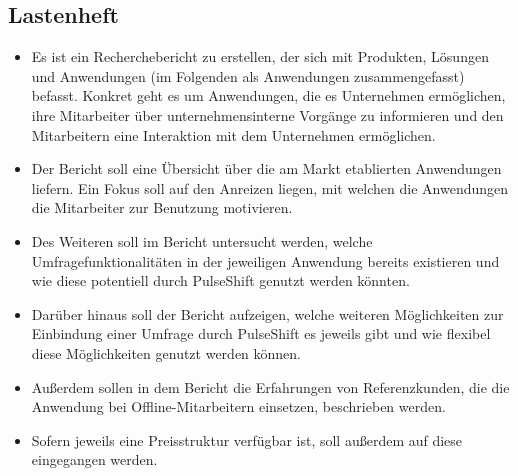 \subsection{Lastenheft}
\begin{itemize}
\item Es ist ein Recherchebericht zu erstellen, der sich mit Produkten, Lösungen und Anwendungen (im Folgenden als Anwendungen zusammengefasst) befasst. Konkret geht es um Anwendungen, die es Unternehmen ermöglichen, ihre Mitarbeiter über unternehmensinterne Vorgänge zu informieren und den Mitarbeitern eine Interaktion mit dem Unternehmen ermöglichen. 
\item Der Bericht soll eine Übersicht über die am Markt etablierten Anwendungen liefern. Ein Fokus soll auf den Anreizen liegen, mit welchen die Anwendungen die Mitarbeiter zur Benutzung motivieren.
\item Des Weiteren soll im Bericht untersucht werden, welche Umfragefunktionalitäten in der jeweiligen Anwendung bereits existieren und wie diese potentiell durch PulseShift genutzt werden könnten. 
\item Darüber hinaus soll der Bericht aufzeigen, welche weiteren Möglichkeiten zur Einbindung einer Umfrage durch PulseShift es jeweils gibt und wie flexibel diese Möglichkeiten genutzt werden können.
\item Außerdem sollen in dem Bericht die Erfahrungen von Referenzkunden, die die Anwendung bei Offline-Mitarbeitern einsetzen, beschrieben werden. 
\item Sofern jeweils eine Preisstruktur verfügbar ist, soll außerdem auf diese eingegangen werden.
\end{itemize}


